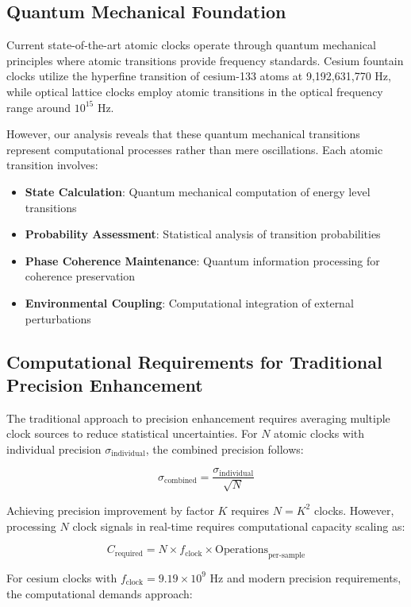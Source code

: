 \documentclass[12pt,a4paper]{article}
\begin{document}
\subsection{Quantum Mechanical Foundation}

Current state-of-the-art atomic clocks operate through quantum mechanical principles where atomic transitions provide frequency standards. Cesium fountain clocks utilize the hyperfine transition of cesium-133 atoms at 9,192,631,770 Hz, while optical lattice clocks employ atomic transitions in the optical frequency range around $10^{15}$ Hz.

However, our analysis reveals that these quantum mechanical transitions represent computational processes rather than mere oscillations. Each atomic transition involves:

\begin{itemize}
\item \textbf{State Calculation}: Quantum mechanical computation of energy level transitions
\item \textbf{Probability Assessment}: Statistical analysis of transition probabilities
\item \textbf{Phase Coherence Maintenance}: Quantum information processing for coherence preservation
\item \textbf{Environmental Coupling}: Computational integration of external perturbations
\end{itemize}

\subsection{Computational Requirements for Traditional Precision Enhancement}

The traditional approach to precision enhancement requires averaging multiple clock sources to reduce statistical uncertainties. For $N$ atomic clocks with individual precision $\sigma_{\text{individual}}$, the combined precision follows:

$$\sigma_{\text{combined}} = \frac{\sigma_{\text{individual}}}{\sqrt{N}}$$

Achieving precision improvement by factor $K$ requires $N = K^2$ clocks. However, processing $N$ clock signals in real-time requires computational capacity scaling as:

$$C_{\text{required}} = N \times f_{\text{clock}} \times \text{Operations}_{\text{per-sample}}$$

For cesium clocks with $f_{\text{clock}} = 9.19 \times 10^9$ Hz and modern precision requirements, the computational demands approach:
\end{document}
